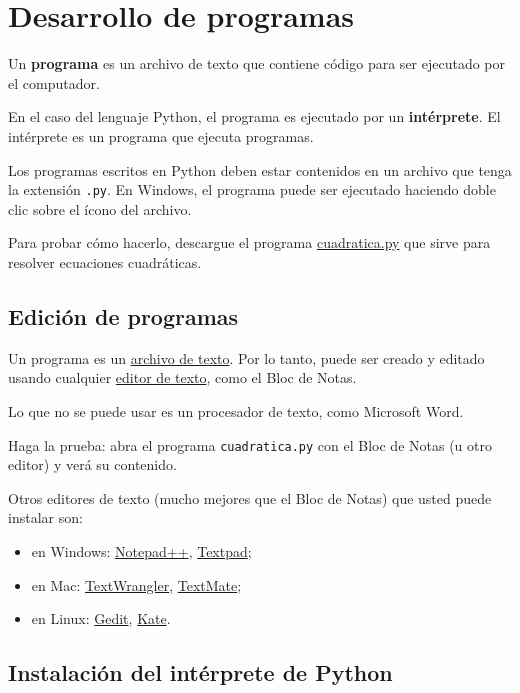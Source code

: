 \chapter{Desarrollo de programas}

Un \textbf{programa} es un archivo de texto que contiene código para ser
ejecutado por el computador.

En el caso del lenguaje Python, el programa es ejecutado por un
\textbf{intérprete}. El intérprete es un programa que ejecuta programas.

Los programas escritos en Python deben estar contenidos en un archivo
que tenga la extensión \lstinline!.py!. En Windows, el programa puede
ser ejecutado haciendo doble clic sobre el ícono del archivo.

Para probar cómo hacerlo, descargue el programa
\href{../\_static/programas/cuadratica.py}{cuadratica.py} que sirve para
resolver ecuaciones cuadráticas.

\section{Edición de programas}

Un programa es un
\href{http://es.wikipedia.org/wiki/Archivo\_de\_texto}{archivo de
texto}. Por lo tanto, puede ser creado y editado usando cualquier
\href{http://es.wikipedia.org/wiki/Editor\_de\_texto}{editor de texto},
como el Bloc de Notas.

Lo que no se puede usar es un procesador de texto, como Microsoft Word.

Haga la prueba: abra el programa \lstinline!cuadratica.py! con el Bloc
de Notas (u otro editor) y verá su contenido.

Otros editores de texto (mucho mejores que el Bloc de Notas) que usted
puede instalar son:

\begin{itemize}
\item
  en Windows: \href{http://notepad-plus-plus.org/}{Notepad++},
  \href{http://www.textpad.com/}{Textpad};
\item
  en Mac:
  \href{http://www.barebones.com/products/textwrangler/}{TextWrangler},
  \href{http://macromates.com/}{TextMate};
\item
  en Linux: \href{http://projects.gnome.org/gedit/}{Gedit},
  \href{http://kate-editor.org/}{Kate}.
\end{itemize}

\section{Instalación del intérprete de Python}


